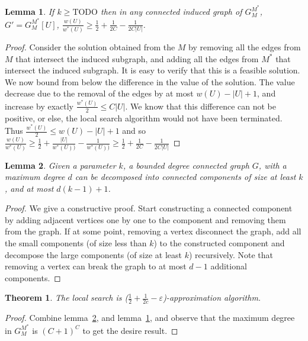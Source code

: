 \documentclass[draft]{article}
\newtheorem{lemma}{Lemma}
\newtheorem{theorem}{Theorem}
\begin{document}
\begin{lemma}
\label{lemma:r}
If $k \geq \text{TODO}$ then in any connected induced graph of $G^{M^*}_M$, 
$G'= G^{M^*}_M[U]$, 
$
\frac{w(U)}{w^*(U)} 
\geq \frac{1}{2} + \frac{1}{2C} - \frac{1}{2C|U|}
$.
\end{lemma}

\begin{proof}
Consider the solution obtained from the $M$ by removing all the edges from $M$
that intersect the induced subgraph, and adding all the edges from $M^*$ that
intersect the induced subgraph.
It is easy to verify that this is a feasible solution.
We now bound from below the difference in the value of the solution.
The value decrease due to the removal of the edges by at most $w(U) - |U| + 1$,
and increase by exactly $\frac{w^*(U)}{2} \leq C |U|$.
We know that this difference can not be positive, or else, the local search
algorithm would not have been terminated.
Thus 
$\frac{w^*(U)}{2} \leq w(U) - |U| + 1$ 
and so
$
\frac{w(U)}{w^*(U)} 
\geq 
\frac{1}{2} + \frac{|U|}{w^*(U))} - \frac{1}{w^*(U))}  
\geq
\frac{1}{2} + \frac{1}{2C} - \frac{1}{2C|U|}
$
\end{proof}


\begin{lemma}
\label{lemma:dec}
Given a parameter $k$, a bounded degree connected graph $G$, with a maximum
degree $d$ can be decomposed into connected components of size at least $k$, and at most
$d(k-1) + 1$.
\end{lemma}

\begin{proof}
We give a constructive proof.
Start constructing a connected component by adding adjacent vertices
one by one to the component and removing them from the graph.
If at some point, removing a vertex disconnect the graph, add all the small
components (of size less than $k$) to the constructed component and decompose
the large components (of size at least $k$) recursively.
Note that removing a vertex can break the graph to at most $d - 1$ additional
components.
\end{proof}

\begin{theorem}
The local search is ($\frac{1}{2} + \frac{1}{2c} - \varepsilon$)-approximation
algorithm.
\end{theorem}

\begin{proof}
Combine lemma~\ref{lemma:dec}, and lemma~\ref{lemma:r}, 
and observe that the maximum degree in $G^{M^*}_M$ is $(C + 1)^C$ to
get the desire result.
\end{proof}
\end{document}
